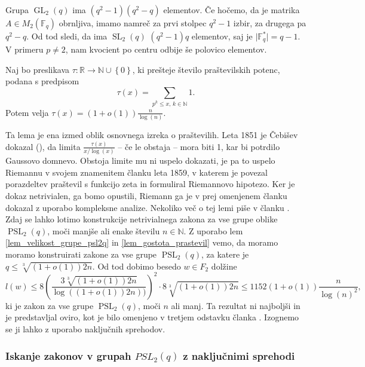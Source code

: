     \begin{dokaz}
    Grupa $\operatorname{GL}_2(q)$ ima $(q^2  -1)(q^2 - q)$ elementov. Če hočemo, da je matrika $A \in M_2(\mathbb{F}_q)$ obrnljiva, imamo namreč za prvi stolpec $q^2 -1$ izbir, za drugega pa $q^2 - q$.
    Od tod sledi, da ima $\operatorname{SL}_2(q)$ $(q^2  -1)q$ elementov, saj je $\lvert \mathbb{F}_q^{*} \rvert = q-1$. V primeru $p \neq 2$, nam kvocient po centru odbije še polovico elementov.   
    \end{dokaz}
    
    \begin{lema}
    \label{lem_gostota_prastevil}
    Naj bo preslikava $\tau : \mathbb{R} \to \mathbb{N} \cup \left\{ 0\right\}$, ki prešteje število praštevilskih potenc, podana s predpisom \begin{equation*}
    \tau(x) = \sum_{p^{k} \le x, \, k \in \mathbb{N}} 1.
    \end{equation*}  
     Potem velja $\tau(x) = (1 + o(1)) \frac{n}{\log(n)}$.     
    \end{lema}
    Ta lema je ena izmed oblik osnovnega izreka o praštevilih. Leta 1851 je Čebišev dokazal (\cite[str.~4--5]{Granville_1993}), da limita $\frac{\tau(x)}{x / \log(x)}$ -- če le obstaja -- mora biti 1, kar bi potrdilo Gaussovo domnevo. Obstoja limite mu ni uspelo dokazati, je pa to uspelo Riemannu v svojem znamenitem članku \cite{Riemann_1859} leta 1859, v katerem je povezal porazdeltev praštevil s funkcijo zeta in formuliral Riemannovo hipotezo.
    Ker je dokaz netrivialen, ga bomo opustili, Riemann ga je v prej omenjenem članku dokazal z uporabo kompleksne analize. 
    Nekoliko več o tej lemi piše v članku \cite{Kozma_Thom_2016}.            
    \noindent
    Zdaj se lahko lotimo konstrukcije netrivialnega zakona za vse grupe oblike $\operatorname{PSL}_2(q)$, moči manjše ali enake številu $n \in \mathbb{N}$. Z uporabo lem \ref{lem_velikost_grupe_psl2q} in \ref{lem_gostota_prastevil}
    vemo, da moramo moramo konstruirati zakone za vse grupe $\operatorname{PSL}_2(q)$, za katere je $q \le \sqrt[3]{(1 + o(1)) 2n}$. Od tod dobimo besedo $w \in F_2$ dolžine \begin{equation*}
    l(w) \le 8 \left( \frac{3 \sqrt[3]{(1 + o(1)) 2n}}{\log((1 + o(1)) 2n))}  \right)^2 \cdot 8 \sqrt[3]{(1 + o(1)) 2n} \le 1152 (1 + o(1)) \frac{n}{\log(n)^2},
    \end{equation*}  
    ki je zakon za vse grupe $\operatorname{PSL}_2(q)$, moči $n$ ali manj. Ta rezultat ni najboljši in je predstavljal oviro, kot je bilo omenjeno v tretjem odstavku članka \cite[str.~6]{Bradford_Thom_2017}.
    Izognemo se ji lahko z uporabo naključnih sprehodov.

    \subsubsection{Iskanje zakonov v grupah $PSL_2(q)$ z naključnimi sprehodi}
    

\cite{Kozma_Thom_2016}